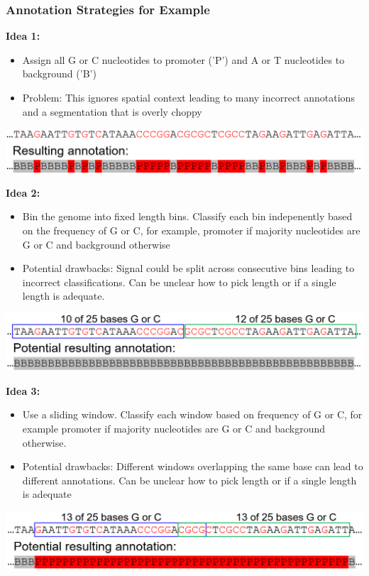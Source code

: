 \documentclass[10pt]{article}
\begin{document}
\subsubsection*{Annotation Strategies for Example}
\textbf{Idea 1:}
\begin{itemize}
	\item Assign all G or C nucleotides to promoter ('P') and A or T nucleotides to background ('B')
	\item Problem: This ignores spatial context leading to many incorrect annotations and a segmentation that is overly choppy
\end{itemize}
\begin{center} 
	\includegraphics*[width=\textwidth]{W9_7.png} 
\end{center}
\textbf{Idea 2:}
\begin{itemize}
	\item Bin the genome into fixed length bins.  Classify each bin indepenently based on the frequency of G or C, for example, promoter if majority nucleotides are G or C and background otherwise
	\item Potential drawbacks: Signal could be split across consecutive bins leading to incorrect classifications.  Can be unclear how to pick length or if a single length is adequate.
\end{itemize}
\begin{center} 
	\includegraphics*[width=\textwidth]{W9_8.png} 
\end{center}
\textbf{Idea 3:}
\begin{itemize}
	\item Use a sliding window.  Classify each window based on frequency of G or C, for example promoter if majority nucleotides are G or C and background otherwise.
	\item Potential drawbacks: Different windows overlapping the same base can lead to different annotations.  Can be unclear how to pick length or if a single length is adequate
\end{itemize}
\begin{center} 
	\includegraphics*[width=\textwidth]{W9_9.png} 
\end{center}
\end{document}
